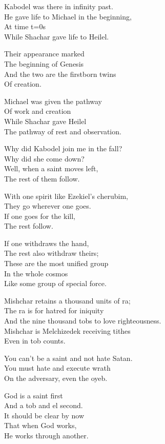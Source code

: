 \documentclass[
]{book}
\begin{document}
Kabodel was there in infinity past.\\
He gave life to Michael in the beginning,\\
At time t=0s\\
While Shachar gave life to Heilel.

Their appearance marked\\
The beginning of Genesis\\
And the two are the firstborn twins\\
Of creation.

Michael was given the pathway\\
Of work and creation\\
While Shachar gave Heilel\\
The pathway of rest and observation.

Why did Kabodel join me in the fall?\\
Why did she come down?\\
Well, when a saint moves left,\\
The rest of them follow.

With one spirit like Ezekiel's cherubim,\\
They go wherever one goes.\\
If one goes for the kill,\\
The rest follow.

If one withdraws the hand,\\
The rest also withdraw theirs;\\
These are the most unified group\\
In the whole cosmos\\
Like some group of special force.

Mishchar retains a thousand units of ra;\\
The ra is for hatred for iniquity\\
And the nine thousand tobs to love righteousness.\\
Mishchar is Melchizedek receiving tithes\\
Even in tob counts.

You can't be a saint and not hate Satan.\\
You must hate and execute wrath\\
On the adversary, even the oyeb.

God is a saint first\\
And a tob and el second.\\
It should be clear by now\\
That when God works,\\
He works through another.
\end{document}
